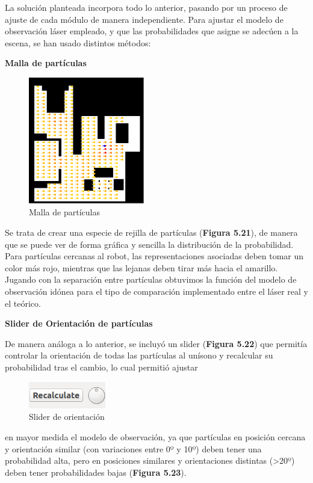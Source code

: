 La solución planteada incorpora todo lo anterior, pasando por un proceso de ajuste de cada módulo de manera independiente. Para ajustar el modelo de observación láser empleado, y que las probabilidades que asigne se adecúen a la escena, se han usado distintos métodos:
\vspace{4cm}

\textbf{Malla de partículas}

\begin{multicols}{2}
	\begin{figure}[H]
		\begin{center}
		\includegraphics[width=0.45\textwidth]{figures/mallaparticulas.png}
		\caption{Malla de partículas}
		\label{fig.mallaparticulas}
		\end{center}
	\end{figure}
Se trata de crear una especie de rejilla de partículas (\textbf{Figura 5.21}), de manera que se puede ver de forma gráfica y sencilla la distribución de la probabilidad. Para partículas cercanas al robot, las representaciones asociadas deben tomar un color más rojo, mientras que las lejanas deben tirar más hacia el amarillo. Jugando con la separación entre partículas obtuvimos la función del modelo de observación idónea para el tipo de comparación implementado entre el láser real y el teórico.
\end{multicols}

\textbf{Slider de Orientación de partículas}

\begin{multicols}{2}
De manera análoga a lo anterior, se incluyó un slider (\textbf{Figura 5.22}) que permitía controlar la orientación de todas las partículas al unísono y recalcular su probabilidad tras el cambio, lo cual permitió ajustar 
	\begin{figure}[H]
		\begin{center}
		\includegraphics[width=0.30\textwidth]{figures/slider.png}
		\caption{Slider de orientación}
		\label{fig.slider}
		\end{center}
	\end{figure}
\end{multicols}
en mayor medida el modelo de observación, ya que partículas en posición cercana y orientación similar (con variaciones entre 0º y 10º) deben tener una probabilidad alta, pero en posiciones similares y orientaciones distintas (>20º) deben tener probabilidades bajas (\textbf{Figura 5.23}).

